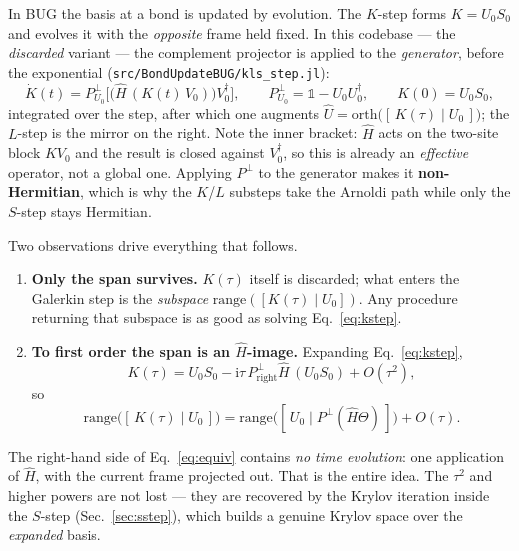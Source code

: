 \documentclass[11pt,a4paper]{article}
\newcommand{\Hb}{\hat{H}}
\newcommand{\Theb}{\Theta}
\newcommand{\Pperp}{P^{\perp}}
\newcommand{\file}[1]{\texttt{\small #1}}
\begin{document}
In BUG the basis at a bond is updated by evolution. The $K$-step forms $K = U_0 S_0$ and
evolves it with the \emph{opposite} frame held fixed. In this codebase --- the
\emph{discarded} variant --- the complement projector is applied to the \emph{generator}, before
the exponential (\file{src/BondUpdateBUG/kls\_step.jl}):
\begin{equation}
  \dot K(t) = \Pperp_{U_0}\Big[\big(\Hb\,(K(t)\,V_0)\big)V_0^\dagger\Big],
  \qquad
  \Pperp_{U_0} = \mathbb{1} - U_0U_0^\dagger,
  \qquad K(0) = U_0 S_0,
  \label{eq:kstep}
\end{equation}
integrated over the step, after which one augments
$\hat U = \mathrm{orth}\big([\,K(\tau) \mid U_0\,]\big)$; the $L$-step is the mirror on the
right. Note the inner bracket: $\Hb$ acts on the two-site block $K V_0$ and the result is closed
against $V_0^\dagger$, so this is already an \emph{effective} operator, not a global one.
Applying $\Pperp$ to the generator makes it \textbf{non-Hermitian}, which is why the $K$/$L$
substeps take the Arnoldi path while only the $S$-step stays Hermitian.

Two observations drive everything that follows.

\begin{enumerate}[leftmargin=1.4em]
\item \textbf{Only the span survives.} $K(\tau)$ itself is discarded; what enters the Galerkin
step is the \emph{subspace} $\mathrm{range}([K(\tau) \mid U_0])$. Any procedure returning that
subspace is as good as solving Eq.~\eqref{eq:kstep}.
\item \textbf{To first order the span is an $\Hb$-image.} Expanding
Eq.~\eqref{eq:kstep},
\begin{equation}
  K(\tau) = U_0 S_0 - \mathrm{i}\tau\, \Pperp_{\text{right}} \Hb\, (U_0 S_0) + O(\tau^2),
\end{equation}
so
\begin{equation}
  \boxed{\;\mathrm{range}\big([\,K(\tau) \mid U_0\,]\big)
       = \mathrm{range}\big([\,U_0 \mid \Pperp (\Hb\Theb)\,]\big) + O(\tau).\;}
  \label{eq:equiv}
\end{equation}
\end{enumerate}

The right-hand side of Eq.~\eqref{eq:equiv} contains \emph{no time evolution}: one application
of $\Hb$, with the current frame projected out. That is the entire idea. The $\tau^2$ and higher
powers are not lost --- they are recovered by the Krylov iteration inside the $S$-step
(Sec.~\ref{sec:sstep}), which builds a genuine Krylov space over the \emph{expanded} basis.
\end{document}
